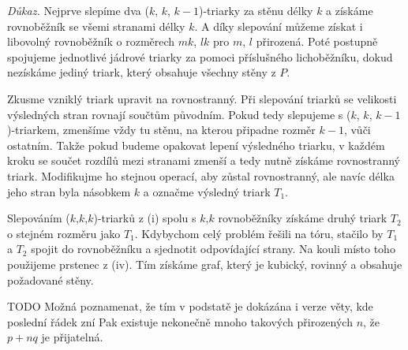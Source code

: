 \textit{Důkaz.} Nejprve slepíme dva ($k$, $k$, $k-1$)-triarky za stěnu délky $k$ a získáme rovnoběžník se všemi stranami délky $k$. A díky slepování můžeme získat i libovolný rovnoběžník o rozměrech $mk$, $lk$ pro $m$, $l$ přirozená. Poté postupně spojujeme jednotlivé jádrové triarky za pomoci příslušného lichoběžníku, dokud nezískáme jediný triark, který obsahuje všechny stěny z $P$.

Zkusme vzniklý triark upravit na rovnostranný. Při slepování triarků se velikosti výsledných stran rovnají součtům původním. Pokud tedy slepujeme s ($k$, $k$, $k-1$)-triarkem, zmenšíme vždy tu stěnu, na kterou připadne rozměr $k-1$, vůči ostatním. Takže pokud budeme opakovat lepení výsledného triarku, v každém kroku se součet rozdílů mezi stranami zmenší a tedy nutně získáme rovnostranný triark. Modifikujme ho stejnou operací, aby zůstal rovnostranný, ale navíc délka jeho stran byla násobkem $k$ a označme výsledný triark $T_1$.

Slepováním ($k$,$k$,$k$)-triarků z (i) spolu s $k$,$k$ rovnoběžníky získáme druhý triark $T_2$ o stejném rozměru jako $T_1$. Kdybychom celý problém řešili na tóru, stačilo by $T_1$ a $T_2$ spojit do rovnoběžníku a sjednotit odpovídající strany. Na kouli místo toho použijeme prstenec z (iv). Tím získáme graf, který je kubický, rovinný a obsahuje požadované stěny.

TODO Možná poznamenat, že tím v podstatě je dokázána i verze věty, kde poslední řádek zní Pak existuje nekonečně mnoho takových přirozených $n$, že $p+nq$ je přijatelná.